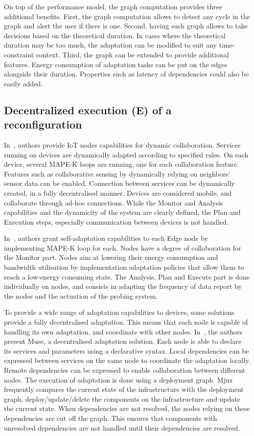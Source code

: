 \documentclass{article}
\begin{document}
On top of the performance model, the graph computation provides three additional benefits. First, the graph computation allows to detect any cycle in the graph and alert the user if there is one. Second, having such graph allows to take decisions based on the theoretical duration. In cases where the theoretical duration may be too much, the adaptation can be modified to suit any time-constraint context. Third, the graph can be extended to provide additional features. Energy consumption of adaptation tasks can be put on the edges alongside their duration. Properties such as latency of dependencies could also be easily added.

\subsection{Decentralized execution (E) of a reconfiguration}

In~\cite{homeostatis2019tuning}, authors provide IoT nodes capabilities for dynamic collaboration. Services running on devices are dynamically adapted according to specified rules. On each device, several MAPE-K loops are running, one for each collaboration feature. Features such as collaborative sensing by dynamically relying on neighbors' sensor data can be enabled. Connection between services can be dynamically created, in a fully decentralised manner. Devices are considered mobile, and collaborate through ad-hoc connections. While the Monitor and Analysis capabilities and the dynamicity of the system are clearly defined, the Plan and Execution steps, especially communication between devices is not handled. 

In~\cite{colombo2022p2pmonitoring}, authors grant self-adaptation capabilities to each Edge node by implementing MAPE-K loop for each. Nodes have a degree of collaboration for the Monitor part. Nodes aim at lowering their energy consumption and bandwidth utilisation by implementation adaptation policies that allow them to reach a low-energy consuming state. The Analysis, Plan and Execute part is done individually on nodes, and consists in adapting the frequency of data report by the nodes and the actuation of the probing system.

To provide a wide range of adaptation capabilities to devices, some solutions provide a fully decentralised adaptation. This means that each node is capable of handling its own adaptation, and coordinate  with other nodes. In~\cite{sokolowski_mjuz_2021}, the authors present Muse, a decentralised adaptation solution. Each node is able to declare its services and parameters using a declarative syntax. Local dependencies can be expressed between services on the same node to coordinate the adaptation locally. Remote dependencies can be expressed to enable collaboration between different nodes. The execution of adaptation is done using a deployment graph. Mjuz frequently compares the current state of the infrastructure with the deployment graph, deploy/update/delete the components on the infrastructure and update the current state. When dependencies are not resolved, the nodes relying on these dependencies are cut off the graph. This ensures that components with unresolved dependencies are not handled until their dependencies are resolved.
\end{document}
